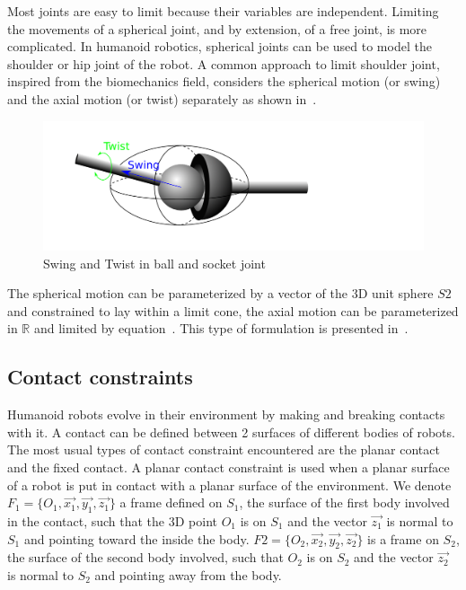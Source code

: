Most joints are easy to limit because their variables are independent.
Limiting the movements of a spherical joint, and by extension, of a free joint, is more complicated.
In humanoid robotics, spherical joints can be used to model the shoulder or hip joint of the robot.
A common approach to limit shoulder joint, inspired from the biomechanics field, considers the spherical motion (or swing) and the axial motion (or twist) separately as shown in~.

\begin{figure}[htpb]
  \centering
  \includegraphics[width=0.7\linewidth]{ballAndSocket.pdf}
  \caption{Swing and Twist in ball and socket joint}
\label{fig:ballAndSocket}
\end{figure}

The spherical motion can be parameterized by a vector of the 3D unit sphere $S2$ and constrained to lay within a limit cone, the axial motion can be parameterized in $\mathbb{R}$ and limited by equation~.
This type of formulation is presented in~\cite{baerlocher}.



\subsection{Contact constraints}
\label{sub:contact_constraints}


Humanoid robots evolve in their environment by making and breaking contacts with it.
A contact can be defined between 2 surfaces of different bodies of robots.
The most usual types of contact constraint encountered are the planar contact and the fixed contact.
A planar contact constraint is used when a planar surface of a robot is put in contact with a planar surface of the environment.
We denote $F_1 = \{O_1, \vec{x_1}, \vec{y_1}, \vec{z_1}\}$ a frame defined on $S_1$, the surface of the first body involved in the contact, such that the 3D point $O_1$ is on $S_1$ and the vector $\vec{z_1}$ is normal to $S_1$ and pointing toward the inside the body.
$F2 = \{O_2, \vec{x_2}, \vec{y_2}, \vec{z_2}\}$ is a frame on $S_2$, the surface of the second body involved, such that $O_2$ is on $S_2$ and the vector $\vec{z_2}$ is normal to $S_2$ and pointing away from the body.

